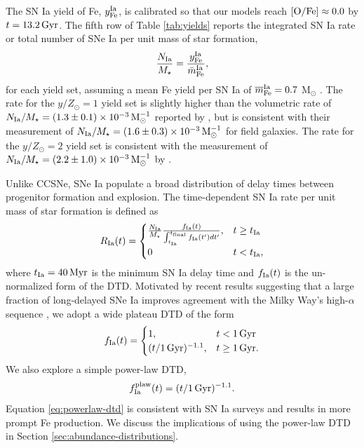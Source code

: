 \documentclass[twocolumn,twocolappendix]{aastex701}
\newcommand{\mathOFe}{{\rm [O/Fe]}}
\newcommand{\yZ}[1]{$y/Z_\odot=#1$}
\begin{document}
The SN Ia yield of Fe, $y_{\rm Fe}^{\rm Ia}$, is calibrated so that our models reach $\mathOFe\approx0.0$ by $t=13.2\,{\rm Gyr}$. The fifth row of Table \ref{tab:yields} reports the integrated SN Ia rate or total number of SNe Ia per unit mass of star formation,
\begin{equation}
    \frac{N_{\rm Ia}}{M_\star} = \frac{y_{\rm Fe}^{\rm Ia}}{\bar m_{\rm Fe}^{\rm Ia}},
    \label{eq:snia-rate}
\end{equation}
for each yield set, assuming a mean Fe yield per SN Ia of $\overline m_{\rm Fe}^{\rm Ia}=0.7$ M$_\odot$ \citep{mazzali_common_2007,howell_effect_2009}. The rate for the \yZ{1} yield set is slightly higher than the volumetric rate of $N_{\rm Ia}/M_\star=(1.3\pm0.1)\times10^{-3}\,{\rm M}_\odot^{-1}$ reported by \citet{maoz_star_2017}, but is consistent with their measurement of $N_{\rm Ia}/M_\star=(1.6\pm0.3)\times10^{-3}\,{\rm M}_\odot^{-1}$ for field galaxies. The rate for the \yZ{2} yield set is consistent with the measurement of $N_{\rm Ia}/M_\star=(2.2\pm1.0)\times10^{-3}\,{\rm M}_\odot^{-1}$ by \citet{maoz_type-ia_2012}.

Unlike CCSNe, SNe Ia populate a broad distribution of delay times between progenitor formation and explosion. The time-dependent SN Ia rate per unit mass of star formation is defined as
\begin{equation}
    R_{\rm Ia}(t) = 
    \begin{cases}
        \frac{N_{\rm Ia}}{M_\star}
        \frac{f_{\rm Ia}(t)}{\int_{t_{\rm Ia}}^{t_{\rm final}} f_{\rm Ia}(t') dt'}, & t \ge t_{\rm Ia} \\
        0 & t < t_{\rm Ia},
    \end{cases}
    \label{eq:dtd-function}
\end{equation}
where $t_{\rm Ia}=40\,{\rm Myr}$ is the minimum SN Ia delay time and $f_{\rm Ia}(t)$ is the un-normalized form of the DTD. Motivated by recent results suggesting that a large fraction of long-delayed SNe Ia improves agreement with the Milky Way's high-$\alpha$ sequence \citep{palicio_analytic_2023,dubay_galactic_2024}, we adopt a wide plateau DTD of the form
\begin{equation}
    \label{eq:plateau-dtd}
    f_{\rm Ia}(t) =
    \begin{cases}
        1, & t < 1\,{\rm Gyr} \\
        (t/1\,{\rm Gyr})^{-1.1}, & t \ge 1\,{\rm Gyr}.
    \end{cases}
\end{equation}
We also explore a simple power-law DTD,
\begin{equation}
    f_{\rm Ia}^{\rm plaw}(t) = (t/1\,\rm{Gyr})^{-1.1}.
    \label{eq:powerlaw-dtd}
\end{equation}
Equation \ref{eq:powerlaw-dtd} is consistent with SN Ia surveys \citep[e.g.,][]{maoz_star_2017} and results in more prompt Fe production.
We discuss the implications of using the power-law DTD in Section \ref{sec:abundance-distributions}.
\end{document}
